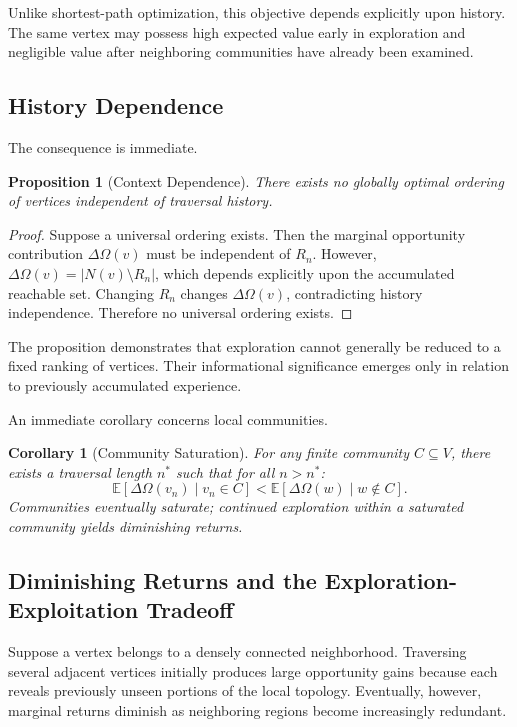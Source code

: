 \documentclass[12pt,oneside]{article}
\newtheorem{proposition}[definition]{Proposition}
\newtheorem{corollary}[definition]{Corollary}
\theoremstyle{remark}
\begin{document}
Unlike shortest-path optimization, this objective depends explicitly upon history. The same vertex may possess high expected value early in exploration and negligible value after neighboring communities have already been examined.

\subsection{History Dependence}

The consequence is immediate.

\begin{proposition}[Context Dependence]
There exists no globally optimal ordering of vertices independent of traversal history.
\end{proposition}

\begin{proof}
Suppose a universal ordering exists. Then the marginal opportunity contribution \(\Delta\Omega(v)\) must be independent of \(R_n\). However, \(\Delta\Omega(v) = |N(v) \setminus R_n|\), which depends explicitly upon the accumulated reachable set. Changing \(R_n\) changes \(\Delta\Omega(v)\), contradicting history independence. Therefore no universal ordering exists.
\end{proof}

The proposition demonstrates that exploration cannot generally be reduced to a fixed ranking of vertices. Their informational significance emerges only in relation to previously accumulated experience.

An immediate corollary concerns local communities.

\begin{corollary}[Community Saturation]
For any finite community \(C \subseteq V\), there exists a traversal length \(n^*\) such that for all \(n > n^*\):
\[
\mathbb{E}[\Delta\Omega(v_n) \mid v_n \in C] < \mathbb{E}[\Delta\Omega(w) \mid w \notin C].
\]
Communities eventually saturate; continued exploration within a saturated community yields diminishing returns.
\end{corollary}

\subsection{Diminishing Returns and the Exploration-Exploitation Tradeoff}

Suppose a vertex belongs to a densely connected neighborhood. Traversing several adjacent vertices initially produces large opportunity gains because each reveals previously unseen portions of the local topology. Eventually, however, marginal returns diminish as neighboring regions become increasingly redundant.
\end{document}
